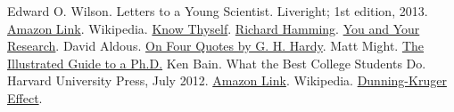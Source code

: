 \documentclass[a6paper]{article}
\begin{document}
\begin{thebibliography}{00}
     Edward O. Wilson. Letters to a Young Scientist. Liveright; 1st edition, 2013. \href{https://www.amazon.in/Letters-Young-Scientist-Edward-Wilson-ebook/dp/B00AR3551Y}{Amazon Link}.
     Wikipedia. \href{https://en.wikipedia.org/wiki/Know_thyself}{Know Thyself}.
     \href{https://en.wikipedia.org/wiki/Richard_Hamming}{Richard Hamming}. \href{https://www.cs.virginia.edu/~robins/YouAndYourResearch.html}{You and Your Research}.
     David Aldous. \href{https://medium.com/cantors-paradise/on-four-quotes-from-g-h-hardy-36083e56228e}{On Four Quotes by G. H. Hardy}.
     Matt Might. \href{http://matt.might.net/articles/phd-school-in-pictures/}{The Illustrated Guide to a Ph.D.}
     Ken Bain. What the Best College Students Do. Harvard University Press, July 2012. \href{https://www.amazon.in/What-Best-College-Students-Do-ebook/dp/B008L42UJ6}{Amazon Link}.
     Wikipedia. \href{https://en.wikipedia.org/wiki/Dunning%E2%80%93Kruger_effect}{Dunning-Kruger Effect}.
\end{thebibliography}
\end{document}
